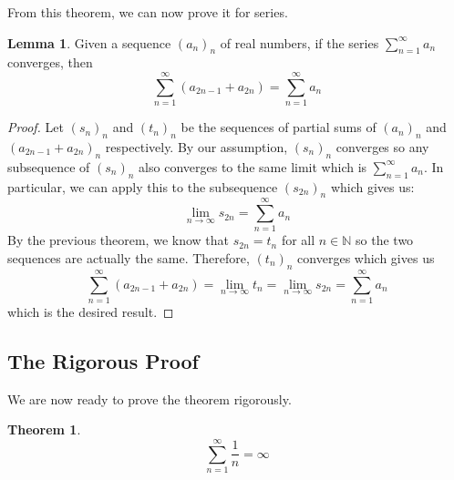 \documentclass[12pt]{article}
\newcommand{\N}{\mathbb{N}}
\theoremstyle{definition}
\newtheorem*{theorem}{Theorem}
\newtheorem{lemma}{Lemma}
\begin{document}
From this theorem, we can now prove it for series.

\begin{lemma} \label{lemma3}
    Given a sequence $(a_n)_n$ of real numbers, if the series $\sum_{n=1}^{\infty}a_n$ converges, then
    $$\sum_{n=1}^{\infty}(a_{2n-1} + a_{2n}) = \sum_{n=1}^{\infty}a_n$$
\end{lemma}

\begin{proof}
    Let $(s_n)_n$ and $(t_n)_n$ be the sequences of partial sums of $(a_n)_n$ and $(a_{2n-1} + a_{2n})_n$ respectively. By our assumption, $(s_n)_n$ converges so any subsequence of $(s_n)_n$ also converges to the same limit which is $\sum_{n=1}^{\infty}a_n$. In particular, we can apply this to the subsequence $(s_{2n})_n$ which gives us:
    $$\lim_{n \rightarrow \infty}s_{2n} = \sum_{n=1}^{\infty}a_n$$ 
    By the previous theorem, we know that $s_{2n} = t_n$ for all $n \in \N$ so the two sequences are actually the same. Therefore, $(t_n)_n$ converges which gives us
    $$\sum_{n=1}^{\infty}(a_{2n-1} + a_{2n}) = \lim_{n \rightarrow \infty}t_n = \lim_{n \rightarrow \infty}s_{2n} = \sum_{n=1}^{\infty}a_n$$
    which is the desired result.
\end{proof}

\subsection{The Rigorous Proof}

We are now ready to prove the theorem rigorously.

\begin{theorem}
    $$\sum_{n=1}^{\infty}\frac{1}{n} = \infty$$
\end{theorem}
\end{document}
